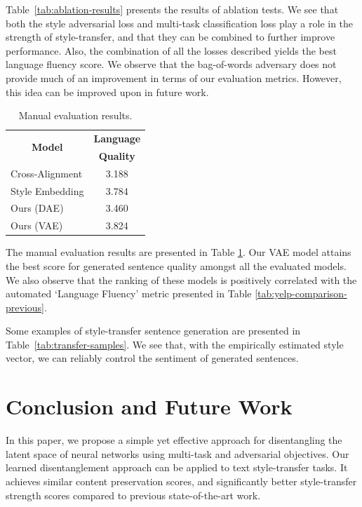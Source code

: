 \documentclass[letterpaper]{article} %
\newcommand{\tabh}[1]{\multicolumn{1}{c|}{\textbf{#1}}}
\newcommand{\tabc}[2]{\multicolumn{1}{|c||}{\multirow{#1}{*}{\textbf{#2}}}}
\begin{document}
Table~\ref{tab:ablation-results} presents the results of ablation tests.
We see that both the style adversarial loss and multi-task classification loss play a role in the strength of style-transfer, and that they can be combined to further improve performance.
Also, the combination of all the losses described yields the best language fluency score.
We observe that the bag-of-words adversary does not provide much of an improvement in terms of our evaluation metrics.
However, this idea can be improved upon in future work.

\begin{table}[ht]
	\centering
	\begin{tabular}{| l || c |}
		\hline
		\tabc{2}{Model}                      & \tabh{Language} \\
		                                     & \tabh{Quality}  \\
		\hline
		\hline
		Cross-Alignment \cite{shen2017style} & 3.188           \\
		\hline
		Style Embedding \cite{fu2017style}   & 3.784           \\
		\hline
		Ours (DAE)                           & 3.460           \\
		\hline
		Ours (VAE)                           & 3.824           \\
		\hline
	\end{tabular}
	\caption{Manual evaluation results.}
	\label{tab:manual-evaluation}
\end{table}

The manual evaluation results are presented in Table \ref{tab:manual-evaluation}.
Our VAE model attains the best score for generated sentence quality amongst all the evaluated models.
We also observe that the ranking of these models is positively correlated with the automated `Language Fluency' metric presented in Table \ref{tab:yelp-comparison-previous}.

Some examples of style-transfer sentence generation are presented in Table~\ref{tab:transfer-samples}.
We see that, with the empirically estimated style vector, we can reliably control the sentiment of generated sentences.

\section{Conclusion and Future Work}
In this paper, we propose a simple yet effective approach for disentangling the latent space of neural networks using multi-task and adversarial objectives.
Our learned disentanglement approach can be applied to text style-transfer tasks.
It achieves similar content preservation scores, and significantly better style-transfer strength scores compared to previous state-of-the-art work.
\end{document}
